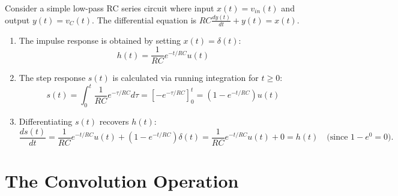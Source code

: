 \documentclass[12pt,a4paper]{article}
\begin{document}
\begin{tcolorbox}[examplebox, title={\textbf{Derivation Example: Step Response of First-Order RC Circuit}}]
Consider a simple low-pass RC series circuit where input $x(t) = v_{in}(t)$ and output $y(t) = v_C(t)$. The differential equation is $RC \frac{dy(t)}{dt} + y(t) = x(t)$.
\begin{enumerate}[topsep=2pt, itemsep=2pt]
  \item The impulse response is obtained by setting $x(t) = \delta(t)$:
  \begin{equation*}
    h(t) = \frac{1}{RC} e^{-t/RC} u(t)
  \end{equation*}
  \item The step response $s(t)$ is calculated via running integration for $t \ge 0$:
  \begin{equation*}
    s(t) = \int_0^t \frac{1}{RC} e^{-\tau/RC} d\tau = \left[ -e^{-\tau/RC} \right]_0^t = \left( 1 - e^{-t/RC} \right) u(t)
  \end{equation*}
  \item Differentiating $s(t)$ recovers $h(t)$:
  \begin{equation*}
    \frac{ds(t)}{dt} = \frac{1}{RC} e^{-t/RC} u(t) + (1 - e^{-t/RC}) \delta(t) = \frac{1}{RC} e^{-t/RC} u(t) + 0 = h(t) \quad \text{(since } 1-e^0 = 0\text{)}.
  \end{equation*}
\end{enumerate}
\end{tcolorbox}

\section{The Convolution Operation}
\end{document}
